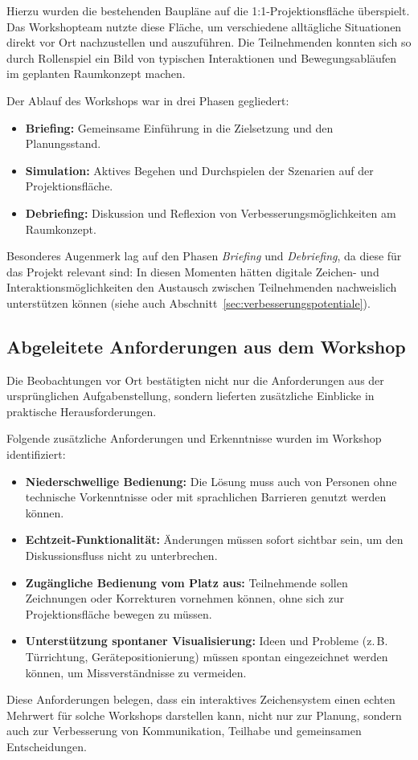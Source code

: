 Hierzu wurden die bestehenden Baupläne auf die 1:1-Projektionsfläche überspielt. Das Workshopteam nutzte diese Fläche, um verschiedene alltägliche Situationen direkt vor Ort nachzustellen und auszuführen. Die Teilnehmenden konnten sich so durch Rollenspiel ein Bild von typischen Interaktionen und Bewegungsabläufen im geplanten Raumkonzept machen.

Der Ablauf des Workshops war in drei Phasen gegliedert:

\begin{itemize}
  \item \textbf{Briefing:} Gemeinsame Einführung in die Zielsetzung und den Planungsstand.
  \item \textbf{Simulation:} Aktives Begehen und Durchspielen der Szenarien auf der Projektionsfläche.
  \item \textbf{Debriefing:} Diskussion und Reflexion von Verbesserungsmöglichkeiten am Raumkonzept.
\end{itemize}

Besonderes Augenmerk lag auf den Phasen \textit{Briefing} und \textit{Debriefing}, da diese für das Projekt relevant sind: In diesen Momenten hätten digitale Zeichen- und Interaktionsmöglichkeiten den Austausch zwischen Teilnehmenden nachweislich unterstützen können (siehe auch Abschnitt~\ref{sec:verbesserungspotentiale}).



\subsection{Abgeleitete Anforderungen aus dem Workshop}

Die Beobachtungen vor Ort bestätigten nicht nur die Anforderungen aus der ursprünglichen Aufgabenstellung, sondern lieferten zusätzliche Einblicke in praktische Herausforderungen.

Folgende zusätzliche Anforderungen und Erkenntnisse wurden im Workshop identifiziert:

\begin{itemize}
  \item \textbf{Niederschwellige Bedienung:} Die Lösung muss auch von Personen ohne technische Vorkenntnisse oder mit sprachlichen Barrieren genutzt werden können.
  \item \textbf{Echtzeit-Funktionalität:} Änderungen müssen sofort sichtbar sein, um den Diskussionsfluss nicht zu unterbrechen.
  \item \textbf{Zugängliche Bedienung vom Platz aus:} Teilnehmende sollen Zeichnungen oder Korrekturen vornehmen können, ohne sich zur Projektionsfläche bewegen zu müssen.
  \item \textbf{Unterstützung spontaner Visualisierung:} Ideen und Probleme (z.\,B. Türrichtung, Gerätepositionierung) müssen spontan eingezeichnet werden können, um Missverständnisse zu vermeiden.
\end{itemize}

Diese Anforderungen belegen, dass ein interaktives Zeichensystem einen echten Mehrwert für solche Workshops darstellen kann, nicht nur zur Planung, sondern auch zur Verbesserung von Kommunikation, Teilhabe und gemeinsamen Entscheidungen.


